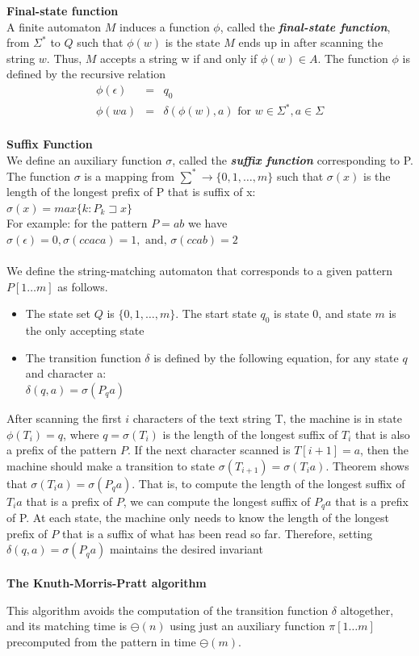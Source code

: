 \documentclass[12pt]{article}
\begin{document}
\textbf{Final-state function}\\
A finite automaton $M$ induces a function $\phi$, called the \textbf{\textit{final-state function}}, from $\Sigma^*$ to $Q$ such that $\phi (w)$ is the state $M$ ends up in after scanning the string $w$. Thus, $M$ accepts a string w if and only if $\phi (w) \in A $. The function $\phi $ is defined by the recursive relation
\begin{eqnarray*}
	\phi (\epsilon) & = & q_0
 	\\ \phi (wa) & = & \delta (\phi (w),a) \mbox{ for } w \in \Sigma^{*}, a \in \Sigma 
\end{eqnarray*} 
\\
\textbf{Suffix Function}\\
We define an auxiliary function $ \sigma $, called the \textbf{\textit{suffix function}} corresponding to P. The function $ \sigma $ is a mapping from $ \sum^{\ast} \rightarrow \{0,1,\ldots,m\} $ such that $ \sigma (x) $ is the length of the longest prefix of P that is suffix of x:\\
$ \sigma (x) = max \{k:P_k \sqsupset x\} $ \\
For example: for the pattern $ P = ab $ we have $ \sigma (\epsilon) = 0, \sigma (ccaca) = 1, \mbox{ and, } \sigma(ccab)=2 $ \\ \\
We define the string-matching automaton that corresponds to a given pattern $P[1\ldots m] $ as follows.
\begin{itemize}
	\item The state set $ Q $ is $ \{0,1,\ldots,m\}$. The start state $q_0$ is state 0, and state $m$ is the only accepting state
	\item The transition function $\delta$ is defined by the following equation, for any state $q$ and character a: \\
	$ \delta (q,a) = \sigma (P_{q}a) $
\end{itemize}

After scanning the first $i$ characters of the text string T, the machine is in state $\phi (T_i) = q$, where $q = \sigma(T_i)$ is the length of the longest suffix of $T_i$ that is also a prefix of the pattern $P$. If the next character scanned is $T[i+1] = a$, then the machine should make a transition to state $\sigma(T_{i+1}) = \sigma(T_i a)$. Theorem shows that $\sigma(T_i a) = \sigma(P_q a)$. That is, to compute the length of the longest suffix of $T_i a$ that is a prefix of $P$, we can compute the longest suffix of $P_q a$ that is a prefix of P. At each state, the machine only needs to know the length of the longest prefix of $P$ that is a suffix of what has been read so far. Therefore, setting $\delta(q,a) = \sigma(P_q a)$ maintains the desired invariant
\\ \\
\textbf{The Knuth-Morris-Pratt algorithm}

This algorithm avoids the computation of the transition function $\delta$ altogether, and its matching time is $\ominus (n)$ using just an auxiliary function $\pi[1 \ldots m]$ precomputed from the pattern in time $\ominus (m)$. 
\end{document}
